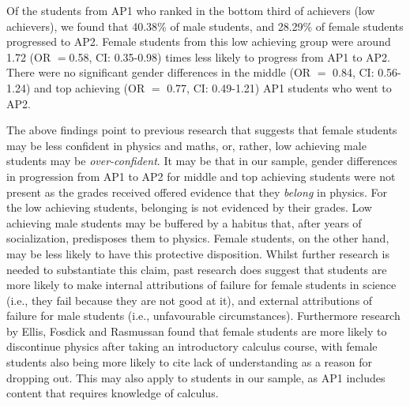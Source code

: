 Of the students from AP1 who ranked in the bottom third of achievers (low achievers), we found that 40.38\% of male students, and 28.29\% of female students progressed to AP2. Female students from this low achieving group were around 1.72 (OR $=$0.58, CI: 0.35-0.98) times less likely to progress from AP1 to AP2. There were no significant gender differences in the middle (OR $=$ 0.84, CI: 0.56-1.24) and top achieving (OR $=$ 0.77, CI: 0.49-1.21) AP1 students who went to AP2.

The above findings point to previous research that suggests that female students may be less confident in physics\cite{B_E_2013,Sharma_2011,Hofer_2016} and maths\cite{Else_Quest_2013, Sheldrake_2015}, or, rather, low achieving male students may be \textit{over-confident}. It may be that in our sample, gender differences in progression from AP1 to AP2 for middle and top achieving students were not present as the grades received offered evidence that they \textit{belong} in physics. For the low achieving students, belonging is not evidenced by their grades. Low achieving male students may be buffered by a habitus that, after years of socialization, predisposes them to physics. Female students, on the other hand, may be less likely to have this protective disposition. Whilst further research is needed to substantiate this claim, past research does suggest that students are more likely to make internal attributions of failure for female students in science (i.e., they fail because they are not good at it), and external attributions of failure for male students (i.e., unfavourable circumstances)\cite{LaCosse_2016}. Furthermore research by Ellis, Fosdick and Rasmussan\cite{Ellis_2016} found that female students are more likely to discontinue physics after taking an introductory calculus course, with female students also being more likely to cite lack of understanding as a reason for dropping out. This may also apply to students in our sample, as AP1 includes content that requires knowledge of calculus.

